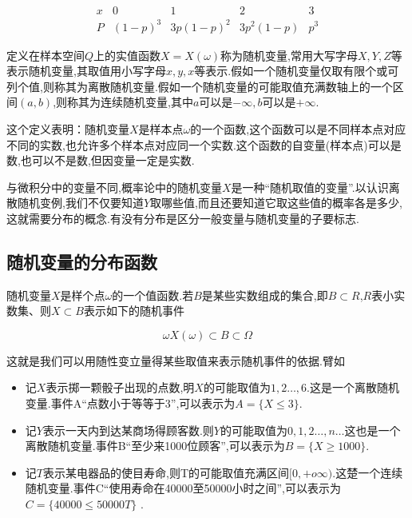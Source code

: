 \[ 
\begin{array}{c|cccc}{x} & {0} & {1} & {2} & {3} \\ \hline P & {(1-p)^{3}} & {3 p(1-p)^{2}} & {3 p^{2}(1-p)} & {p^{3}}\end{array}
\]

\begin{definition}
	定义在样本空间$ Q $上的实值函数$ X=X(\omega) $称为随机变量,常用大写字母$ X,Y,Z $等表示随机变量,其取值用小写字母$ x,y,x $等表示.假如一个随机变量仅取有限个或可列个值,则称其为离散随机变量.假如一个随机变量的可能取值充满数轴上的一个区间$ (a,b) $,则称其为连续随机变量,其中$ a $可以是$ -\infty ,b $可以是$ +\infty $.
\end{definition}


这个定义表明：随机变量$ X $是样本点$ \omega $的一个函数,这个函数可以是不同样本点对应不同的实数,也允许多个样本点对应同一个实数.这个函数的自变量(样本点)可以是数,也可以不是数,但因变量一定是实数.

与微积分中的变量不同,概率论中的随机变量$ X $是一种“随机取值的变量”.以认识离散随机变例,我们不仅要知道$ Y $取哪些值,而且还要知道它取这些值的概率各是多少,这就需要分布的概念.有没有分布是区分一般变量与随机变量的子要标志.

\subsection{随机变量的分布函数}

随机变量$ X $是样个点$ \omega $的一个值函数.若$ B $是某些实数组成的集合,即$ B\subset R $,$ R $表小实数集、则$ X\subset B $表示如下的随机事件

\[
\omega X(\omega)\subset B \subset \Omega
\]

这就是我们可以用随性变立量得某些取值来表示随机事件的依据.臂如

\begin{itemize}
	\item 记$ X $表示掷一颗骰子出现的点数,明$ X $的可能取值为$ 1,2\dotsc ,6 $.这是一个离散随机变量.事件A“点数小于等等于3”,可以表示为$ A=\{X\leq 3\} $.
	\item 记$ Y $表示一天内到达某商场得顾客数.则$ Y $的可能取值为$ 0,1,2\dotsc ,n\dotsc $这也是一个离散随机变量.事件B“至少来1000位顾客”,可以表示为$ B=\{ X\geq 1000 \} $.
	\item 记$ T $表示某电器品的使目寿命,则T的可能取值充满区间$ [0,+o\infty ) $.这楚一个连续随机变量.事件C“使用寿命在40000至50000小时之间”,可以表示为$ C=\{ 40000 \leq 50000 T\} $ . 
\end{itemize}



